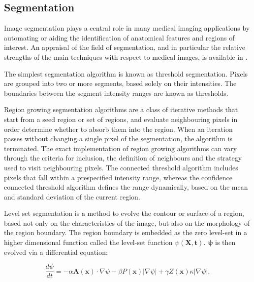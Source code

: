   \subsection{Segmentation} %
  \label{sub:segmentation}
    Image segmentation plays a central role in many medical imaging applications by automating or aiding the identification of anatomical features and regions of interest. An appraisal of the field of segmentation, and in particular the relative strengths of the main techniques with respect to medical images, is available in \cite{Pham1998,Sharma2010}.
    
    The simplest segmentation algorithm is known as threshold segmentation. Pixels are grouped into two or more segments, based solely on their intensities. The boundaries between the segment intensity ranges are known as thresholds.
    
    Region growing segmentation algorithms are a class of iterative methods that start from a seed region or set of regions, and evaluate neighbouring pixels in order determine whether to absorb them into the region. When an iteration passes without changing a single pixel of the segmentation, the algorithm is terminated. The exact implementation of region growing algorithms can vary through the criteria for inclusion, the definition of neighbours and the strategy used to visit neighbouring pixels. The connected threshold algorithm includes pixels that fall within a prespecified intensity range, whereas the confidence connected threshold algorithm defines the range dynamically, based on the mean and standard deviation of the current region. 
    
    Level set segmentation is a method to evolve the contour or surface of a region, based not only on the characteristics of the image, but also on the morphology of the region boundary. The region boundary is embedded as the zero level-set in a higher dimensional function called the level-set function $\psi(\mathbf{X}, \mathbf{t})$. $\mathbf{\psi}$ is then evolved via a differential equation:
    
    \begin{equation}
      \frac{d\psi}{dt} = -\alpha\mathbf{A}(\mathbf{x}) \cdot \nabla \psi - \beta P(\mathbf{x})|\nabla\psi| + \gamma Z(\mathbf{x})\kappa|\nabla\psi|,
    \end{equation}
    

